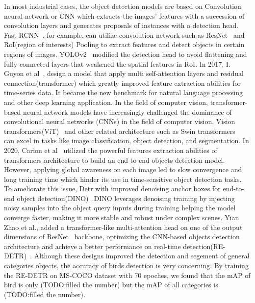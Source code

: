 In most industrial cases, the object detection models are based on Convolution neural network or CNN which extracts 
the images' features with a succession of convolution layers and generates proposals of instances with a detection head.
Fast-RCNN~\cite{fastrcnn}, for example, can utilize convolution network such as ResNet~\cite{resnet} and RoI(region of interests)
Pooling to extract features and detect objects in certain regions of images. YOLOv2~\cite{yolov2} modified the detection head 
to avoid flattening and fully-connected layers that weakened the spatial features in RoI.
In 2017, I. Guyon et al~\cite{transformer}, design a model that apply multi self-attention layers and residual connection(transformer)
which greatly improved feature extraction abilities for time-series data. It became the new benchmark for natural language processing
and other deep learning application. In the field of computer vision, 
transformer-based neural network models have increasingly challenged the dominance of convolutional neural networks (CNNs) 
in the field of computer vision. Vision transformers(ViT)~\cite{vit} and other related architecture such as Swin transformers~\cite{Swint}
can excel in tasks like image classification, object detection, and segmentation. In 2020, Carion et al~\cite{DETR} utilized 
the powerful features extraction abilities of transformers architecture to build an end to end objects detection model.
However, applying global awareness on each image led to slow convergence and long training time which hinder its use in time-sensitive object detection tasks.
To ameliorate this issue, Detr with improved denoising anchor boxes for end-to-end object detection(DINO)~\cite{dino}.DINO leverages denoising training by injecting noisy samples into the object query inputs during training
helping the model converge faster, making it more stable and robust under complex scenes.
Yian Zhao et al., added a transformer-like multi-attention head on one of the output dimensions of ResNet~\cite{resnet} backbone,
optimizing the CNN-based objects detection architecture and achieve a better performance on real-time detection(RE-DETR)~\cite{RTDETR}. Although 
these designs improved the detection and segement of general categories objects, the accuracy of birds detection 
is very concerning. By training the RE-DETR on MS-COCO dataset with 70 epoches, we found that the mAP of bird is only (TODO:filled the number)
but the mAP of all categories is (TODO:filled the number). 












